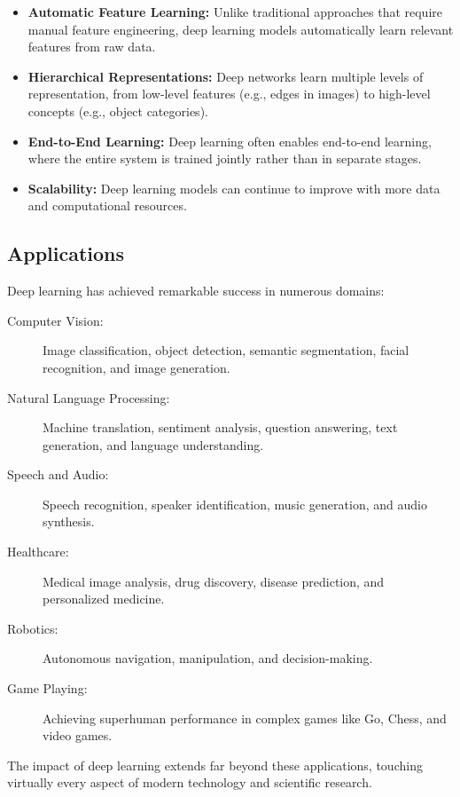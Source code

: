 \begin{itemize}
    \item \textbf{Automatic Feature Learning:} Unlike traditional approaches that require manual feature engineering, deep learning models automatically learn relevant features from raw data.
    
    \item \textbf{Hierarchical Representations:} Deep networks learn multiple levels of representation, from low-level features (e.g., edges in images) to high-level concepts (e.g., object categories).
    
    \item \textbf{End-to-End Learning:} Deep learning often enables end-to-end learning, where the entire system is trained jointly rather than in separate stages.
    
    \item \textbf{Scalability:} Deep learning models can continue to improve with more data and computational resources.
\end{itemize}

\subsection{Applications}

Deep learning has achieved remarkable success in numerous domains:

\begin{description}
    \item[Computer Vision:] Image classification, object detection, semantic segmentation, facial recognition, and image generation.
    
    \item[Natural Language Processing:] Machine translation, sentiment analysis, question answering, text generation, and language understanding.
    
    \item[Speech and Audio:] Speech recognition, speaker identification, music generation, and audio synthesis.
    
    \item[Healthcare:] Medical image analysis, drug discovery, disease prediction, and personalized medicine.
    
    \item[Robotics:] Autonomous navigation, manipulation, and decision-making.
    
    \item[Game Playing:] Achieving superhuman performance in complex games like Go, Chess, and video games.
\end{description}

The impact of deep learning extends far beyond these applications, touching virtually every aspect of modern technology and scientific research.
